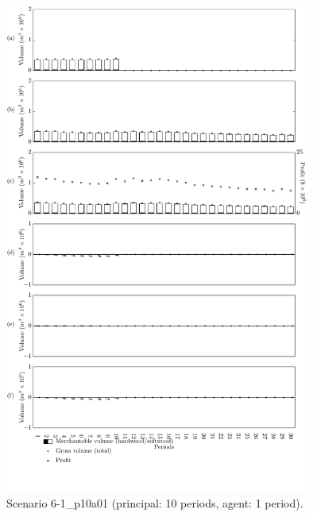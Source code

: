\begin{figure}[h]
  \centering
  \includegraphics[width=10cm]{images/appendix/s6-1_p10a01}
  \caption{Scenario 6-1\_p10a01 (principal: 10 periods, agent: 1 period).}
  \label{fig:s6-1_p10a01}
\end{figure}


